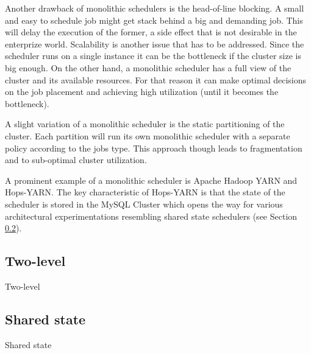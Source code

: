 Another drawback of monolithic schedulers is the head-of-line
blocking. A small and easy to schedule job might get stack behind a
big and demanding job. This will delay the execution of the former, a
side effect that is not desirable in the enterprize world. Scalability
is another issue that has to be addressed. Since the scheduler runs on
a single instance it can be the bottleneck if the cluster size is big
enough. On the other hand, a monolithic scheduler has a full view of the
cluster and its available resources. For that reason it can make
optimal decisions on the job placement and achieving high utilization
(until it becomes the bottleneck).

A slight variation of a monolithic scheduler is the static
partitioning of the cluster. Each partition will run its own
monolithic scheduler with a separate policy according to the jobs
type. This approach though leads to fragmentation and to sub-optimal
cluster utilization.

A prominent example of a monolithic scheduler is Apache Hadoop YARN
and Hops-YARN. The key characteristic of Hops-YARN is that the state of the
scheduler is stored in the MySQL Cluster which opens the way for
various architectural experimentations resembling shared state schedulers (see
Section \ref{ssec:tax_shared_state}).

\subsection{Two-level}
\label{ssec:tax_two_level}
Two-level

\subsection{Shared state}
\label{ssec:tax_shared_state}
Shared state